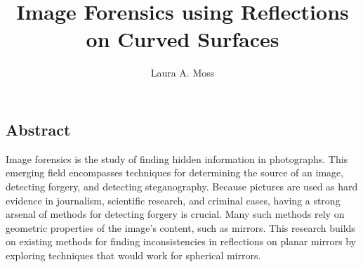 \title{Image Forensics using Reflections on Curved Surfaces}
\author{Laura A. Moss}
\date{}
\maketitle

\newpage

\subsection*{Abstract}
Image forensics is the study of finding hidden information in photographs. This emerging field encompasses techniques for determining the source of an image, detecting forgery, and detecting steganography. Because pictures are used as hard evidence in journalism, scientific research, and criminal cases, having a strong arsenal of methods for detecting forgery is crucial. Many such methods rely on geometric properties of the image's content, such as mirrors. This research builds on existing methods for finding inconsistencies in reflections on planar mirrors by exploring techniques that would work for spherical mirrors.